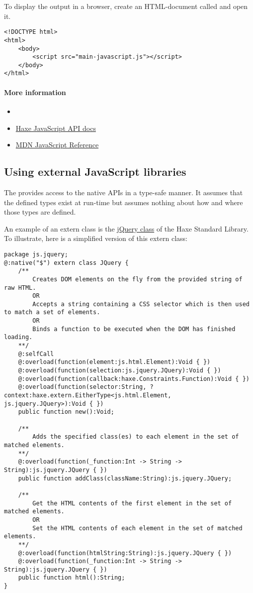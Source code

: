 To display the output in a browser, create an HTML-document called  and open it.

\begin{lstlisting}
<!DOCTYPE html>
<html>
	<body>
		<script src="main-javascript.js"></script>
	</body>
</html>
\end{lstlisting}

\paragraph{More information}

\begin{itemize}
	\item {}
	\item \href{http://api.haxe.org/js/}{Haxe JavaScript API docs}
	\item \href{https://developer.mozilla.org/en-US/docs/Web/JavaScript/Reference}{MDN JavaScript Reference}
\end{itemize}

\subsection{Using external JavaScript libraries}
\label{target-javascript-external-libraries}

The  provides access to the native APIs in a type-safe manner. It assumes that the defined types exist at run-time but assumes nothing about how and where those types are defined.

An example of an extern class is the \href{https://github.com/HaxeFoundation/haxe/blob/development/std/js/jquery/JQuery.hx}{jQuery class} of the Haxe Standard Library.
To illustrate, here is a simplified version of this extern class:

\begin{lstlisting}
package js.jquery;
@:native("$") extern class JQuery {
	/**
		Creates DOM elements on the fly from the provided string of raw HTML.
		OR
		Accepts a string containing a CSS selector which is then used to match a set of elements.
		OR
		Binds a function to be executed when the DOM has finished loading.
	**/
	@:selfCall
	@:overload(function(element:js.html.Element):Void { })
	@:overload(function(selection:js.jquery.JQuery):Void { })
	@:overload(function(callback:haxe.Constraints.Function):Void { })
	@:overload(function(selector:String, ?context:haxe.extern.EitherType<js.html.Element, js.jquery.JQuery>):Void { })
	public function new():Void;

	/**
		Adds the specified class(es) to each element in the set of matched elements.
	**/
	@:overload(function(_function:Int -> String -> String):js.jquery.JQuery { })
	public function addClass(className:String):js.jquery.JQuery;

	/**
		Get the HTML contents of the first element in the set of matched elements.
		OR
		Set the HTML contents of each element in the set of matched elements.
	**/
	@:overload(function(htmlString:String):js.jquery.JQuery { })
	@:overload(function(_function:Int -> String -> String):js.jquery.JQuery { })
	public function html():String;
}
\end{lstlisting}

